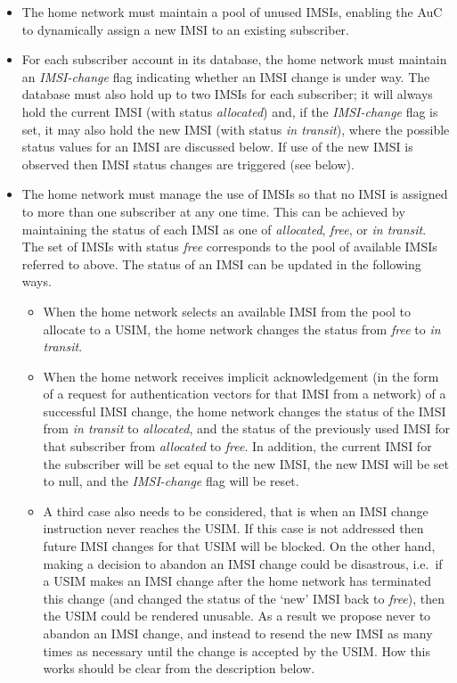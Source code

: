 \documentclass{acm_proc_article-sp}
\begin{document}
\begin{itemize}
\item The home network must maintain a pool of unused IMSIs, enabling the AuC to dynamically assign a new IMSI to an existing subscriber.  

\item For each subscriber account in its database, the home network must maintain an \emph{IMSI-change} flag indicating whether an IMSI change is under way. The database must also hold up to two IMSIs for each subscriber; it will always hold the current IMSI (with status \emph{allocated}) and, if the \emph{IMSI-change} flag is set, it may also hold the new IMSI (with status \emph{in transit}), where the possible status values for an IMSI are discussed below. If use of the new IMSI is observed then IMSI status changes are triggered (see below).

\item The home network must manage the use of IMSIs so that no IMSI is assigned to more than one subscriber at any one time. This can be achieved by maintaining the status of each IMSI as one of \emph{allocated}, \emph{free}, or \emph{in transit}. The set of IMSIs with status \emph{free} corresponds to the pool of available IMSIs referred to above. The status of an IMSI can be updated in the following ways.

\begin{itemize}
	\item When the home network selects an available IMSI from the pool to allocate to a USIM, the home network changes the status from \emph{free} to \emph{in transit}.
	\item When the home network receives implicit acknowledgement (in the form of a request for authentication vectors for that IMSI from a network) of a successful IMSI change, the home network changes the status of the IMSI from \emph{in transit} to \emph{allocated}, and the status of the previously used IMSI  for that subscriber from \emph{allocated} to \emph{free}. In addition, the current IMSI for the subscriber will be set equal to the new IMSI, the new IMSI will be set to null, and the \emph{IMSI-change} flag will be reset.
	\item A third case also needs to be considered, that is when an IMSI change instruction never reaches the USIM. If this case is not addressed then future IMSI changes for that USIM will be blocked. On the other hand, making a decision to abandon an IMSI change could be disastrous, i.e.\ if a USIM makes an IMSI change after the home network has terminated this change (and changed the status of the `new' IMSI back to \emph{free}), then the USIM could be rendered unusable. As a result we propose never to abandon an IMSI change, and instead to resend the new IMSI as many times as necessary until the change is accepted by the USIM. How this works should be clear from the description below.


\end{itemize}
\end{itemize}
\end{document}
